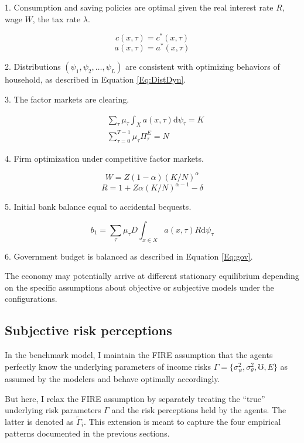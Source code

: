 1. Consumption and saving policies are optimal given the real interest rate $R$, wage $W$, the tax rate $\lambda$.

$$c(x,\tau)= c^*(x,\tau)$$
$$a(x,\tau)= a^*(x,\tau)$$

2. Distributions $\left(\psi_{1}, \psi_{2}, \ldots, \psi_{L}\right)$ are consistent with optimizing behaviors of household, as described in Equation \ref{Eq:DistDyn}.

3. The factor markets are clearing. 

\begin{equation}
\begin{split}
   & \sum_{\tau} \mu_{\tau} \int_{X}a(x, \tau) \mathrm{d} \psi_{\tau}=K \\
& \sum^{T-1}_{\tau=0} \mu_{\tau} \Pi^E_\tau= N
\end{split}
\end{equation}

4. Firm optimization under competitive factor markets.

$$W = Z(1-\alpha) (K/N)^\alpha $$
$$R = 1+Z\alpha (K/N)^{\alpha-1} - \delta$$


5. Initial bank balance equal to accidental bequests. 

$$b_1=\sum_{\tau} \mu_{\tau}D \int_{x \in X} a(x, \tau)R \mathrm{d} \psi_{\tau}$$
 
6. Government budget is balanced as described in Equation \ref{Eq:gov}.

The economy may potentially arrive at different stationary equilibrium depending on the specific assumptions about objective or subjective models under the configurations. 



\subsection{Subjective risk perceptions}

In the benchmark model, I maintain the FIRE assumption that the agents perfectly know the underlying parameters of income risks $\Gamma =\{\sigma^2_\psi,\sigma^2_\theta,\mho,E\}$ as assumed by the modelers and behave optimally accordingly. 

But here, I relax the FIRE assumption by separately treating the ``true'' underlying risk parameters $\Gamma$ and the risk perceptions held by the agents. The latter is denoted as $\tilde \Gamma_i$. This extension is meant to capture the four empirical patterns documented in the previous sections. 

